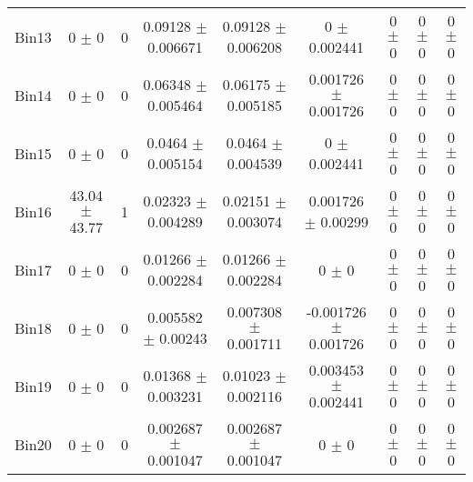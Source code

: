 \begin{tabular}{@{\extracolsep{4pt}}lcccccccc@{}}
     Bin13 & 0 $\pm$ 0 & 0 & 0.09128 $\pm$ 0.006671 & 0.09128 $\pm$ 0.006208 & 0 $\pm$ 0.002441 & 0 $\pm$ 0 & 0 $\pm$ 0 & 0 $\pm$ 0 \\ 
     Bin14 & 0 $\pm$ 0 & 0 & 0.06348 $\pm$ 0.005464 & 0.06175 $\pm$ 0.005185 & 0.001726 $\pm$ 0.001726 & 0 $\pm$ 0 & 0 $\pm$ 0 & 0 $\pm$ 0 \\ 
     Bin15 & 0 $\pm$ 0 & 0 & 0.0464 $\pm$ 0.005154 & 0.0464 $\pm$ 0.004539 & 0 $\pm$ 0.002441 & 0 $\pm$ 0 & 0 $\pm$ 0 & 0 $\pm$ 0 \\ 
     Bin16 & 43.04 $\pm$ 43.77 & 1 & 0.02323 $\pm$ 0.004289 & 0.02151 $\pm$ 0.003074 & 0.001726 $\pm$ 0.00299 & 0 $\pm$ 0 & 0 $\pm$ 0 & 0 $\pm$ 0 \\ 
     Bin17 & 0 $\pm$ 0 & 0 & 0.01266 $\pm$ 0.002284 & 0.01266 $\pm$ 0.002284 & 0 $\pm$ 0 & 0 $\pm$ 0 & 0 $\pm$ 0 & 0 $\pm$ 0 \\ 
     Bin18 & 0 $\pm$ 0 & 0 & 0.005582 $\pm$ 0.00243 & 0.007308 $\pm$ 0.001711 & -0.001726 $\pm$ 0.001726 & 0 $\pm$ 0 & 0 $\pm$ 0 & 0 $\pm$ 0 \\ 
     Bin19 & 0 $\pm$ 0 & 0 & 0.01368 $\pm$ 0.003231 & 0.01023 $\pm$ 0.002116 & 0.003453 $\pm$ 0.002441 & 0 $\pm$ 0 & 0 $\pm$ 0 & 0 $\pm$ 0 \\ 
     Bin20 & 0 $\pm$ 0 & 0 & 0.002687 $\pm$ 0.001047 & 0.002687 $\pm$ 0.001047 & 0 $\pm$ 0 & 0 $\pm$ 0 & 0 $\pm$ 0 & 0 $\pm$ 0 \\ 
\hline\hline
  \end{tabular}

